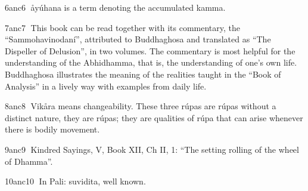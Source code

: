 \documentclass[10pt,a4paper,final]{article}
\begin{document}
\protect\hyperlinksdfootnote6anc6
åyúhana is a term denoting the accumulated kamma. 

\protect\hyperlinksdfootnote7anc7
This book can be read together with its
commentary, the
``Sammohavinodaní'',
attributed to Buddhaghosa and translated as
``The Dispeller of
Delusion'', in two volumes. The
commentary is most helpful for the understanding of the Abhidhamma, that
is, the understanding of one's own life.
Buddhaghosa illustrates the meaning of the realities taught in the
``Book of Analysis''
in a lively way with examples from daily
life. 

\protect\hyperlinksdfootnote8anc8
Vikåra means changeability. These three
rúpas are
rúpas without a distinct nature,
they are 
rúpas; they are qualities of
rúpa that can arise whenever there is bodily movement. 

\protect\hyperlinksdfootnote9anc9
Kindred Sayings, V, Book XII, Ch II, 1: ``The setting rolling of the
wheel of Dhamma''.

\protect\hyperlinksdfootnote10anc10 In
Pali: suvidita, well known. 
\end{document}
